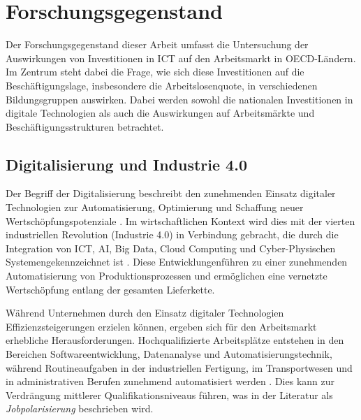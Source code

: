
\section{Forschungsgegenstand}

Der Forschungsgegenstand dieser Arbeit umfasst die Untersuchung der Auswirkungen von 
Investitionen in \ac{ICT} auf den Arbeitsmarkt in \ac{OECD}-Ländern. Im Zentrum steht 
dabei die Frage, wie sich diese Investitionen auf die Beschäftigungslage, insbesondere 
die Arbeitslosenquote, in verschiedenen Bildungsgruppen auswirken. Dabei werden sowohl 
die nationalen Investitionen in digitale Technologien als auch die Auswirkungen auf 
Arbeitsmärkte und Beschäftigungsstrukturen betrachtet.


\subsection{Digitalisierung und Industrie 4.0}

Der Begriff der Digitalisierung beschreibt den zunehmenden Einsatz digitaler Technologien
zur Automatisierung, Optimierung und Schaffung neuer Wertschöpfungspotenziale
\parencite[vgl.][S. 6]{brennen2016theinternational}. Im wirtschaftlichen Kontext wird 
dies mit der vierten industriellen Revolution (Industrie 4.0) in Verbindung gebracht, die 
durch die Integration von \ac{ICT}, \ac{AI}, Big Data, Cloud Computing und 
Cyber-Physischen Systemengekennzeichnet ist 
\parencite[vgl.][S. 22]{kagermann2013recommendations}. Diese Entwicklungenführen zu einer 
zunehmenden Automatisierung von Produktionsprozessen und ermöglichen eine vernetzte 
Wertschöpfung entlang der gesamten Lieferkette.

Während Unternehmen durch den Einsatz digitaler Technologien Effizienzsteigerungen 
erzielen können, ergeben sich für den Arbeitsmarkt erhebliche Herausforderungen. 
Hochqualifizierte Arbeitsplätze entstehen in den Bereichen Softwareentwicklung, 
Datenanalyse und Automatisierungstechnik, während Routineaufgaben in der industriellen 
Fertigung, im Transportwesen und in administrativen Berufen zunehmend automatisiert 
werden \parencite[vgl.][S. 40]{frey2013thefuture}. Dies kann zur Verdrängung mittlerer
Qualifikationsniveaus führen, was in der Literatur als \textit{Jobpolarisierung} 
beschrieben wird.

